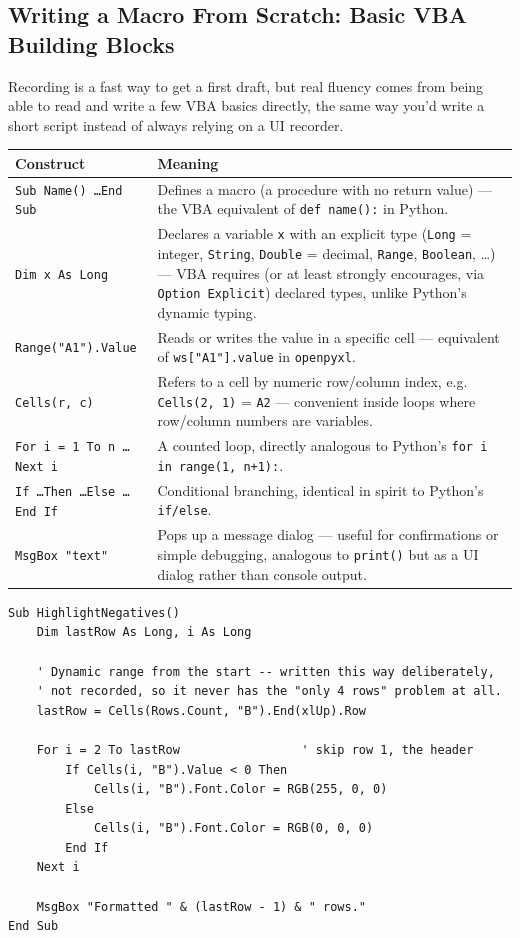 \documentclass[11pt,a4paper]{article}
\begin{document}
\subsection{Writing a Macro From Scratch: Basic VBA Building Blocks}

Recording is a fast way to get a first draft, but real fluency comes from being able to read and write a few VBA basics directly, the same way you'd write a short script instead of always relying on a UI recorder.

\begin{center}
\begin{tabular}{@{}L{3.8cm}L{8.6cm}@{}}
\toprule
\textbf{Construct} & \textbf{Meaning} \\
\midrule
\texttt{Sub Name() \ldots End Sub} & Defines a macro (a procedure with no return value) --- the VBA equivalent of \texttt{def name():} in Python. \\
\texttt{Dim x As Long} & Declares a variable \texttt{x} with an explicit type (\texttt{Long} = integer, \texttt{String}, \texttt{Double} = decimal, \texttt{Range}, \texttt{Boolean}, \ldots) --- VBA requires (or at least strongly encourages, via \texttt{Option Explicit}) declared types, unlike Python's dynamic typing. \\
\texttt{Range("A1").Value} & Reads or writes the value in a specific cell --- equivalent of \texttt{ws["A1"].value} in \texttt{openpyxl}. \\
\texttt{Cells(r, c)} & Refers to a cell by numeric row/column index, e.g. \texttt{Cells(2, 1)} = \texttt{A2} --- convenient inside loops where row/column numbers are variables. \\
\texttt{For i = 1 To n \ldots Next i} & A counted loop, directly analogous to Python's \texttt{for i in range(1, n+1):}. \\
\texttt{If \ldots Then \ldots Else \ldots End If} & Conditional branching, identical in spirit to Python's \texttt{if/else}. \\
\texttt{MsgBox "text"} & Pops up a message dialog --- useful for confirmations or simple debugging, analogous to \texttt{print()} but as a UI dialog rather than console output. \\
\bottomrule
\end{tabular}
\end{center}

\begin{lstlisting}[style=vbastyle, caption={A macro written from scratch: highlight every negative value in a used range, red text}]
Sub HighlightNegatives()
    Dim lastRow As Long, i As Long

    ' Dynamic range from the start -- written this way deliberately,
    ' not recorded, so it never has the "only 4 rows" problem at all.
    lastRow = Cells(Rows.Count, "B").End(xlUp).Row

    For i = 2 To lastRow                 ' skip row 1, the header
        If Cells(i, "B").Value < 0 Then
            Cells(i, "B").Font.Color = RGB(255, 0, 0)
        Else
            Cells(i, "B").Font.Color = RGB(0, 0, 0)
        End If
    Next i

    MsgBox "Formatted " & (lastRow - 1) & " rows."
End Sub
\end{lstlisting}
\end{document}

